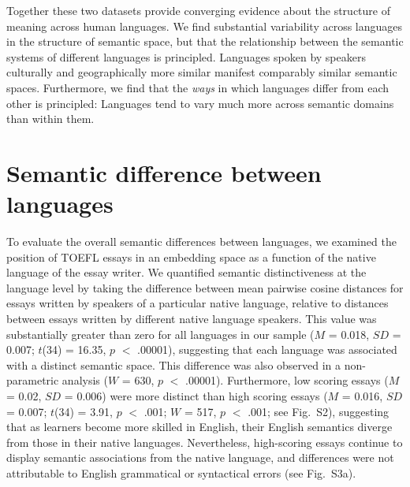 \documentclass[9pt,twocolumn,twoside,lineno]{pnas-new}
\begin{document}
Together these two datasets provide converging evidence about the structure of meaning across human languages. We find substantial variability across languages in the structure of semantic space, but that the relationship between the semantic systems of different languages is principled. Languages spoken by speakers culturally and geographically more similar manifest comparably similar semantic spaces. Furthermore, we find that the {\it ways} in which languages differ from each other is principled: Languages tend to vary much more across semantic domains than within them. 







\section*{Semantic difference between languages}
To evaluate the overall semantic differences between languages, we examined the position of TOEFL essays in an embedding space as a function of the native language of the essay writer. We quantified semantic distinctiveness at the language level by taking the difference between mean pairwise cosine distances for essays written by speakers of a particular native language, relative to distances between essays written by different native language speakers. This value was substantially greater than zero for all languages in our sample ($M$ = 0.018, $SD$ = 0.007; $t$(34) = 16.35, $p$ $<$ .00001), suggesting that each language was associated with a distinct semantic space. This difference was also observed in a non-parametric analysis  ($W$ = 630, $p$ $<$ .00001). Furthermore, low scoring essays ($M$ = 0.02, $SD$ = 0.006) were more distinct than high scoring essays ($M$ = 0.016, $SD$ = 0.007; $t$(34) = 3.91, $p$ $<$ .001; $W$ = 517, $p$ $<$ .001; see Fig.\ S2), suggesting that as learners become more skilled in English, their English semantics diverge from those in their native languages. Nevertheless, high-scoring essays continue to display semantic associations from the native language, and differences were not attributable to English grammatical or syntactical errors (see Fig.\ S3a). 
\end{document}
